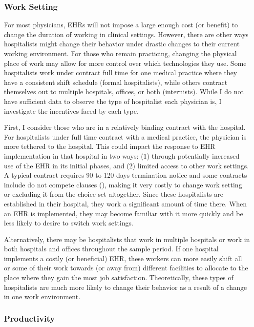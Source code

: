 \documentclass[12pt]{article}
\begin{document}
\subsubsection{Work Setting}

For most physicians, EHRs will not impose a large enough cost (or benefit) to change the duration of working in clinical settings. However, there are other ways hospitalists might change their behavior under drastic changes to their current working environment. For those who remain practicing, changing the physical place of work may allow for more control over which technologies they use. Some hospitalists work under contract full time for one medical practice where they have a consistent shift schedule (formal hospitalists), while others contract themselves out to multiple hospitals, offices, or both (internists). While I do not have sufficient data to observe the type of hospitalist each physician is, I investigate the incentives faced by each type.

First, I consider those who are in a relatively binding contract with the hospital. For hospitalists under full time contract with a medical practice, the physician is more tethered to the hospital. This could impact the response to EHR implementation in that hospital in two ways: (1) through potentially increased use of the EHR in its initial phases, and (2) limited access to other work settings. A typical contract requires 90 to 120 days termination notice and some contracts include do not compete clauses (\cite{yasgur_by_-_yasgur_2016}), making it very costly to change work setting or excluding it from the choice set altogether. Since these hospitalists are established in their hospital, they work a significant amount of time there. When an EHR is implemented, they may become familiar with it more quickly and be less likely to desire to switch work settings.

Alternatively, there may be hospitalists that work in multiple hospitals or work in both hospitals and offices throughout the sample period. If one hospital implements a costly (or beneficial) EHR, these workers can more easily shift all or some of their work towards (or away from) different facilities to allocate to the place where they gain the most job satisfaction. Theoretically, these types of hospitalists are much more likely to change their behavior as a result of a change in one work environment. 


\subsubsection{Productivity}
\end{document}
